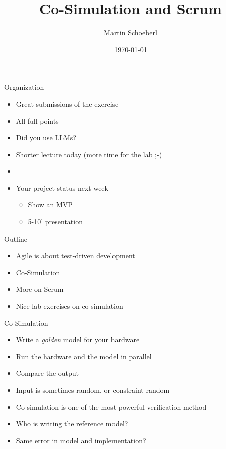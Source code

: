

\newif\ifbook


\usepackage{tikz}
\usetikzlibrary{positioning, arrows.meta}


\title{Co-Simulation and Scrum}
\author{Martin Schoeberl}
\date{\today}



\begin{frame}
\titlepage
\end{frame}


\begin{frame}[fragile]{Organization}
\begin{itemize}
\item Great submissions of the exercise
\item All full points
\item Did you use LLMs?
\item Shorter lecture today (more time for the lab ;-)
\item 
\item Your project status next week
\begin{itemize}
\item Show an MVP
\item 5-10' presentation
\end{itemize}
\end{itemize}
\end{frame}


\begin{frame}[fragile]{Outline}
\begin{itemize}
\item Agile is about test-driven development
\item Co-Simulation
\item More on Scrum
\item Nice lab exercises on co-simulation
\end{itemize}
\end{frame}

\begin{frame}[fragile]{Co-Simulation}
\begin{itemize}
\item Write a \emph{golden} model for your hardware
\item Run the hardware and the model in parallel
\item Compare the output
\item Input is sometimes random, or constraint-random
\item Co-simulation is one of the most powerful verification method
\item Who is writing the reference model?
\item Same error in model and implementation?
\end{itemize}
\end{frame}

